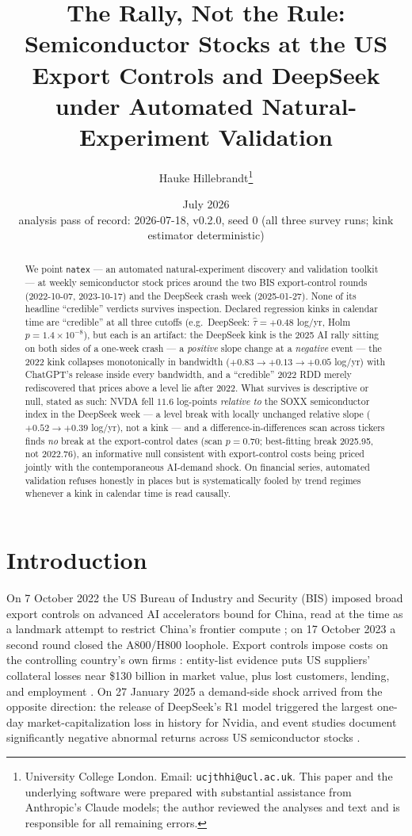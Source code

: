 \documentclass[11pt]{article}
\title{The Rally, Not the Rule: Semiconductor Stocks at the US Export
Controls and DeepSeek under Automated Natural-Experiment Validation}
\author{Hauke Hillebrandt\thanks{University College London. Email:
\texttt{ucjthhi@ucl.ac.uk}. This paper and the underlying \natex{} software were
prepared with substantial assistance from Anthropic's Claude models; the author
reviewed the analyses and text and is responsible for all remaining errors.}}
\date{July 2026 \\ \small analysis pass of record: 2026-07-18, \natex{} v0.2.0,
seed 0 (all three survey runs; kink estimator deterministic)}
\newcommand{\natex}{\texttt{natex}}
\begin{document}
\maketitle

\begin{abstract}
\noindent We point \natex{} --- an automated natural-experiment discovery and
validation toolkit --- at weekly semiconductor stock prices around the two BIS
export-control rounds (2022-10-07, 2023-10-17) and the DeepSeek crash week
(2025-01-27). None of its headline ``credible'' verdicts survives inspection.
Declared regression kinks in calendar time are ``credible'' at all three
cutoffs (e.g.\ DeepSeek: $\hat\tau = +0.48$ log/yr, Holm
$p = 1.4\times 10^{-8}$), but each is an artifact: the DeepSeek kink is the
2025 AI rally sitting on both sides of a one-week crash --- a \emph{positive}
slope change at a \emph{negative} event --- the 2022 kink collapses
monotonically in bandwidth ($+0.83 \to +0.13 \to +0.05$ log/yr) with
ChatGPT's release inside every bandwidth, and a ``credible'' 2022 RDD merely
rediscovered that prices above a level lie after 2022. What survives is
descriptive or null, stated as such: NVDA fell $11.6$ log-points
\emph{relative to} the SOXX semiconductor index in the DeepSeek week --- a
level break with locally unchanged relative slope ($+0.52 \to +0.39$
log/yr), not a kink --- and a difference-in-differences scan across tickers
finds \emph{no} break at the export-control dates (scan $p = 0.70$;
best-fitting break 2025.95, not 2022.76), an informative null consistent
with export-control costs being priced jointly with the contemporaneous
AI-demand shock. On financial series, automated validation refuses honestly
in places but is systematically fooled by trend regimes whenever a kink in
calendar time is read causally.
\end{abstract}

\section{Introduction}\label{sec:intro}

On 7 October 2022 the US Bureau of Industry and Security (BIS) imposed broad
export controls on advanced AI accelerators bound for China, read at the time
as a landmark attempt to restrict China's frontier compute \cite{allen2022};
on 17 October 2023 a second round closed the A800/H800 loophole. Export
controls impose costs on the controlling country's own firms
\cite{bown2020}: entity-list evidence puts US suppliers' collateral losses
near \$130 billion in market value, plus lost customers, lending, and
employment \cite{crosignani2025}. On 27 January 2025 a demand-side shock arrived from
the opposite direction: the release of DeepSeek's R1 model triggered the
largest one-day market-capitalization loss in history for Nvidia, and event
studies document significantly negative abnormal returns across US
semiconductor stocks \cite{han2025}.
\end{document}

